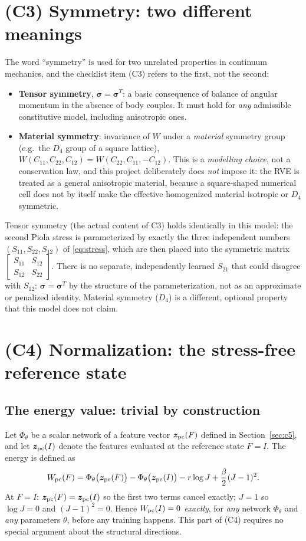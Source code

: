 \documentclass[10pt,a4paper]{article}
\begin{document}
\section{(C3) Symmetry: two different meanings}
\label{sec:c3}
The word ``symmetry'' is used for two unrelated properties in continuum
mechanics, and the checklist item (C3) refers to the first, not the
second:
\begin{itemize}
 \item \textbf{Tensor symmetry}, $\bm\sigma=\bm\sigma^T$: a basic
 consequence of balance of angular momentum in the absence of body
 couples.  It must hold for \emph{any} admissible constitutive model,
 including anisotropic ones.
 \item \textbf{Material symmetry}: invariance of $W$ under a
 \emph{material} symmetry group (e.g.\ the $D_4$ group of a square
 lattice), $W(C_{11},C_{22},C_{12})=W(C_{22},C_{11},-C_{12})$.  This is a
 \emph{modelling choice}, not a conservation law, and this project
 deliberately does \emph{not} impose it: the RVE is treated as a general
 anisotropic material, because a square-shaped numerical cell does not by
 itself make the effective homogenized material isotropic or $D_4$
 symmetric.
\end{itemize}
Tensor symmetry (the actual content of C3) holds identically in this
model: the second Piola stress is parameterized by exactly the three
independent numbers $(S_{11},S_{22},S_{12})$ of \eqref{eq:stress}, which
are then placed into the symmetric matrix
$\left[\begin{smallmatrix}S_{11}&S_{12}\\S_{12}&S_{22}\end{smallmatrix}\right]$.
There is no separate, independently learned $S_{21}$ that could disagree
with $S_{12}$: $\bm\sigma=\bm\sigma^T$ by the structure of the
parameterization, not as an approximate or penalized identity. Material
symmetry ($D_4$) is a different, optional property that this model does
not claim.

\section{(C4) Normalization: the stress-free reference state}
\label{sec:c4}
\subsection{The energy value: trivial by construction}
Let $\Phi_\theta$ be a scalar network of a feature vector $\bm
z_{\rm pc}(F)$ defined in Section~\ref{sec:c5}, and let $\bm
z_{\rm pc}(I)$ denote the features evaluated at the reference state
$F=I$.  The energy is defined as
\begin{equation}
 W_{\rm pc}(F)=\Phi_\theta\big(\bm z_{\rm pc}(F)\big)
 -\Phi_\theta\big(\bm z_{\rm pc}(I)\big)-r\log J+\frac\beta2(J-1)^2 .
 \label{eq:pc-energy}
\end{equation}
At $F=I$: $\bm z_{\rm pc}(F)=\bm z_{\rm pc}(I)$ so the first two terms
cancel exactly; $J=1$ so $\log J=0$ and $(J-1)^2=0$.  Hence
$W_{\rm pc}(I)=0$ \emph{exactly}, for \emph{any} network $\Phi_\theta$ and
\emph{any} parameters $\theta$, before any training happens.  This part
of (C4) requires no special argument about the structural directions.
\end{document}
